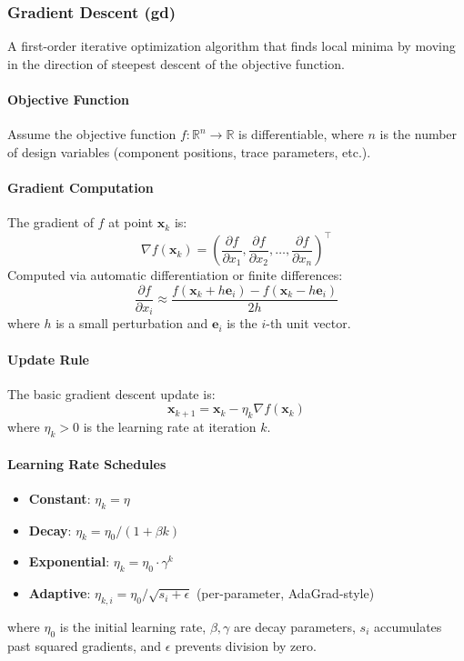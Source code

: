 \documentclass{report}
\begin{document}
\subsubsection{Gradient Descent (gd)}
A first-order iterative optimization algorithm that finds local minima by moving in the direction of steepest descent of the objective function.

\paragraph{Objective Function}
Assume the objective function $f: \mathbb{R}^n \rightarrow \mathbb{R}$ is differentiable, where $n$ is the number of design variables (component positions, trace parameters, etc.).

\paragraph{Gradient Computation}
The gradient of $f$ at point $\mathbf{x}_k$ is:
\begin{equation}
\nabla f(\mathbf{x}_k) = \left(\frac{\partial f}{\partial x_1}, \frac{\partial f}{\partial x_2}, \ldots, \frac{\partial f}{\partial x_n}\right)^{\top}
\end{equation}
Computed via automatic differentiation or finite differences:
\begin{equation}
\frac{\partial f}{\partial x_i} \approx \frac{f(\mathbf{x}_k + h\mathbf{e}_i) - f(\mathbf{x}_k - h\mathbf{e}_i)}{2h}
\end{equation}
where $h$ is a small perturbation and $\mathbf{e}_i$ is the $i$-th unit vector.

\paragraph{Update Rule}
The basic gradient descent update is:
\begin{equation}
\mathbf{x}_{k+1} = \mathbf{x}_k - \eta_k \nabla f(\mathbf{x}_k)
\end{equation}
where $\eta_k > 0$ is the learning rate at iteration $k$.

\paragraph{Learning Rate Schedules}
\begin{itemize}
\item \textbf{Constant}: $\eta_k = \eta$
\item \textbf{Decay}: $\eta_k = \eta_0 / (1 + \beta k)$
\item \textbf{Exponential}: $\eta_k = \eta_0 \cdot \gamma^k$
\item \textbf{Adaptive}: $\eta_{k,i} = \eta_0 / \sqrt{s_i + \epsilon}$ (per-parameter, AdaGrad-style)
\end{itemize}
where $\eta_0$ is the initial learning rate, $\beta, \gamma$ are decay parameters, $s_i$ accumulates past squared gradients, and $\epsilon$ prevents division by zero.
\end{document}
